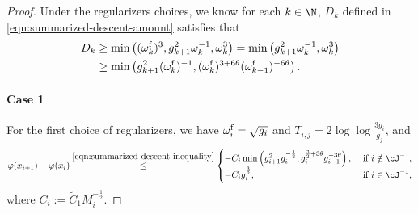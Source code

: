 \begin{proof}
    Under the regularizers choices, we know for each $k \in \N$, $D_k$ defined in \eqref{eqn:summarized-descent-amount} satisfies that 
    \begin{align}
        \nonumber
    D_k 
    &\geq \min\left( (\omega_k^{\mathrm{f}})^3, g_{k+1}^2\omega_k^{-1}, \omega_k^3 \right)
    = \min\left( g_{k+1}^2\omega_k^{-1}, \omega_k^3 \right) \\
    &\geq 
    \min\left( g_{k+1}^2(\omega_k^{\mathrm{f}})^{-1}, (\omega_k^{\mathrm{f}})^{3 + 6\theta}(\omega_{k-1}^{\mathrm{f}})^{-6\theta} \right).
    \label{eqn:proof/lower-bound-of-descent-amount-general}
    \end{align}
    \paragraph{Case 1}
    For the first choice of regularizers, 
    we have $\omega_i^{\mathrm{f}} = \sqrt{g_i}$ and
    $T_{i,j} = 2\log\log \frac{3g_i}{g_j}$, and
    \begin{align*}
        \varphi(x_{i+1}) - \varphi(x_i)
        \overset{\eqref{eqn:summarized-descent-inequality}}{\leq} 
        \begin{cases}
        -C_i\min\left( g_{i+1}^2 g_i^{-\frac{1}{2}}, g_i^{\frac{3}{2} + 3\theta} g_{i-1}^{-3\theta} \right),
        & \text{ if } i \notin \cJ^{-1}, \\
        -C_i g_i^{\frac{3}{2}}, 
        & \text{ if } i \in \cJ^{-1},
        \end{cases}
    \end{align*}
    where $C_i := \tilde C_1 M_i^{-\frac{1}{2}}$.
    

\end{proof}
